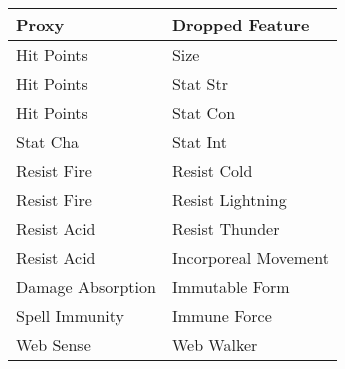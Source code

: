 \documentclass[12pt]{diazessay}
\begin{document}
\begin{table}[!htbp] \centering 
	\caption{Dropped highly correlated features and their proxy}
	\label{tab:dropped-features}
	
\begin{longtable}[]{@{}ll@{}}
	\toprule
	Proxy & Dropped Feature \\
	\midrule
	\endhead
	Hit Points & Size \\
	Hit Points & Stat Str \\
	Hit Points & Stat Con \\
	Stat Cha & Stat Int \\
	Resist Fire & Resist Cold \\
	Resist Fire & Resist Lightning \\
	Resist Acid & Resist Thunder \\
	Resist Acid & Incorporeal Movement \\
	Damage Absorption & Immutable Form \\
	Spell Immunity & Immune Force \\
	Web Sense & Web Walker \\
	\bottomrule
\end{longtable}

\end{table}
\end{document}
